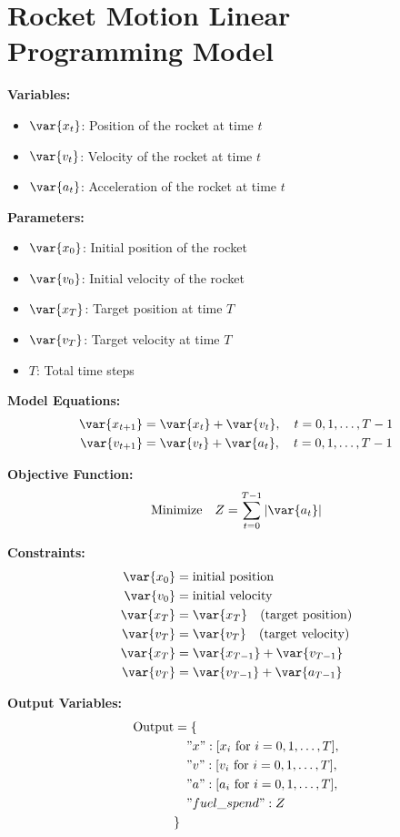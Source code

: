 \documentclass{article}
\begin{document}
\section*{Rocket Motion Linear Programming Model}

\textbf{Variables:}
\begin{itemize}
    \item $\var{x_t}$: Position of the rocket at time $t$
    \item $\var{v_t}$: Velocity of the rocket at time $t$
    \item $\var{a_t}$: Acceleration of the rocket at time $t$
\end{itemize}

\textbf{Parameters:}
\begin{itemize}
    \item $\var{x_0}$: Initial position of the rocket
    \item $\var{v_0}$: Initial velocity of the rocket
    \item $\var{x_T}$: Target position at time $T$
    \item $\var{v_T}$: Target velocity at time $T$
    \item $T$: Total time steps
\end{itemize}

\textbf{Model Equations:}
\begin{align}
    \var{x_{t+1}} &= \var{x_t} + \var{v_t}, \quad t = 0, 1, \ldots, T-1 \\
    \var{v_{t+1}} &= \var{v_t} + \var{a_t}, \quad t = 0, 1, \ldots, T-1
\end{align}

\textbf{Objective Function:}
\begin{align}
    \text{Minimize} \quad Z = \sum_{t=0}^{T-1} |\var{a_t}|
\end{align}

\textbf{Constraints:}
\begin{align}
    \var{x_0} &= \text{initial position} \\
    \var{v_0} &= \text{initial velocity} \\
    \var{x_T} &= \var{x_T} \quad (\text{target position}) \\
    \var{v_T} &= \var{v_T} \quad (\text{target velocity}) \\
    \var{x_{T}} &= \var{x_{T-1}} + \var{v_{T-1}} \\
    \var{v_{T}} &= \var{v_{T-1}} + \var{a_{T-1}}
\end{align}

\textbf{Output Variables:}
\begin{align*}
    \text{Output} &= \{ \\
    &\quad "x": [x_i \text{ for } i = 0, 1, \ldots, T], \\
    &\quad "v": [v_i \text{ for } i = 0, 1, \ldots, T], \\
    &\quad "a": [a_i \text{ for } i = 0, 1, \ldots, T], \\
    &\quad "fuel\_spend": Z \\
    &\}
\end{align*}
\end{document}
